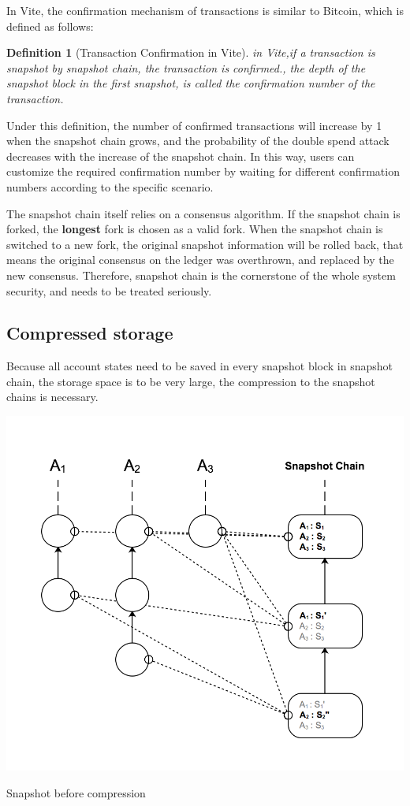 \documentclass[UTF8,nofonts]{article}
\makeatletter
\newtheorem{definition}{Definition}[section]
\newenvironment{figurehere}
 {\def\@captype{figure}}
 {}
\makeatother
\begin{document}
\begin{multicols}{2}
In Vite, the confirmation mechanism of transactions is similar to Bitcoin, which is defined as follows:

\begin{definition}[Transaction Confirmation in Vite]
 in Vite,if a transaction is snapshot by snapshot chain, the transaction is confirmed., the depth of the snapshot block in the first snapshot, is called the confirmation number of the transaction.
\end{definition}

Under this definition, the number of confirmed transactions will increase by 1 when the snapshot chain grows, and the probability of the double spend attack decreases with the increase of the snapshot chain. In this way, users can customize the required confirmation number by waiting for different confirmation numbers according to the specific scenario.

The snapshot chain itself relies on a consensus algorithm. If the snapshot chain is forked, the \textbf {longest} fork is chosen as a valid fork. When the snapshot chain is switched to a new fork, the original snapshot information will be rolled back, that means the original consensus on the ledger was overthrown, and replaced by the new consensus. Therefore, snapshot chain is the cornerstone of the whole system security, and needs to be treated seriously.

\subsection{Compressed storage}
Because all account states need to be saved in every snapshot block in snapshot chain, the storage space is to be very large, the compression to the snapshot chains is necessary.

\begin{center}
\begin{figurehere}
\includegraphics[width=.7\linewidth]{image/compact-snapshot.png}
\caption{Snapshot before compression}
\end{figurehere}
\end{center}


\end{multicols}
\end{document}
